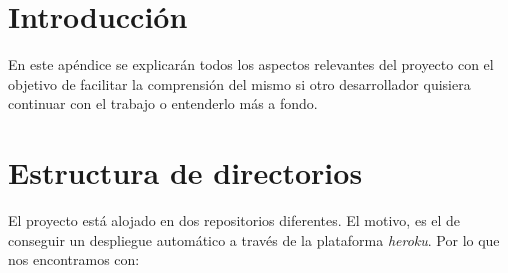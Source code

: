 
\section{Introducción}
En este apéndice se explicarán todos los aspectos relevantes del proyecto con el objetivo de facilitar la comprensión del mismo si otro desarrollador quisiera continuar con el trabajo o entenderlo más a fondo.

\section{Estructura de directorios}

El proyecto está alojado en dos repositorios diferentes. El motivo, es el de conseguir un despliegue automático a través de la plataforma \emph{heroku}. Por lo que nos encontramos con:

